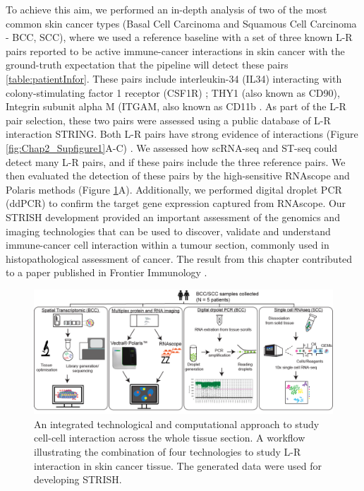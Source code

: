 To achieve this aim, we performed an in-depth analysis of two of the most common skin cancer types (Basal Cell Carcinoma and Squamous Cell Carcinoma - BCC, SCC), where we used a reference baseline with a set of three known L-R pairs reported to be active immune-cancer interactions in skin cancer with the ground-truth expectation that the pipeline will detect these pairs \ref{table:patientInfor}. These pairs include interleukin-34 (IL34) interacting with colony-stimulating factor 1 receptor (CSF1R) \cite{lin2008discovery};  THY1 (also known as CD90), Integrin subunit alpha M (ITGAM, also known as CD11b \cite{wetzel2004human}. As part of the L-R pair selection, these two pairs were assessed using a public database of L-R interaction STRING. Both L-R pairs have strong evidence of interactions (Figure \ref{fig:Chap2_Supfigure1}A-C) \cite{jensen2009string}. We assessed how scRNA-seq and ST-seq could detect many L-R pairs, and if these pairs include the three reference pairs. We then evaluated the detection of these pairs by the high-sensitive RNAscope and Polaris methods (Figure \ref{fig:Chap2_figure1}A). Additionally, we performed digital droplet PCR (ddPCR) to confirm the target gene expression captured from RNAscope. Our STRISH development provided an important assessment of the genomics and imaging technologies that can be used to discover, validate and understand immune-cancer cell interaction within a tumour section, commonly used in histopathological assessment of cancer. The result from this chapter contributed to a paper published in Frontier Immunology \cite{tran2022robust}.  
\begin{figure}[htp]
    \centering
    \includegraphics[width=\columnwidth]{Chapter2/Figures/Chapter2_techsum_figure1.png}
    \caption[An integrated technological and computational approach to study cell-cell interaction across the whole tissue section.]{ An integrated technological and computational approach to study cell-cell interaction across the whole tissue section. A workflow illustrating the combination of four technologies to study L-R interaction in skin cancer tissue. The generated data were used for developing STRISH.}
    \label{fig:Chap2_figure1}
\end{figure}

